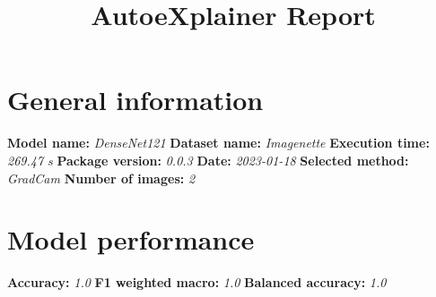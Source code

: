 \documentclass{article}%
\title{AutoeXplainer Report}%
\date{}%
\begin{document}
%
\normalsize%
\maketitle%
\section*{General information}%
\label{sec:Generalinformation}%
\textbf{Model name: }%
\textit{DenseNet121 \newline%
}%
\textbf{Dataset name: }%
\textit{Imagenette \newline%
}%
\textbf{Execution time: }%
\textit{269.47 s \newline%
}%
\textbf{Package version: }%
\textit{0.0.3 \newline%
}%
\textbf{Date: }%
\textit{2023{-}01{-}18 \newline%
}%
\textbf{Selected method: }%
\textit{GradCam \newline%
}%
\textbf{Number of images: }%
\textit{2}

%
\section*{Model performance}%
\label{sec:Modelperformance}%
\textbf{Accuracy: }%
\textit{1.0 \newline%
}%
\textbf{F1 weighted macro: }%
\textit{1.0 \newline%
}%
\textbf{Balanced accuracy: }%
\textit{1.0 \newline%
}

%
\end{document}
